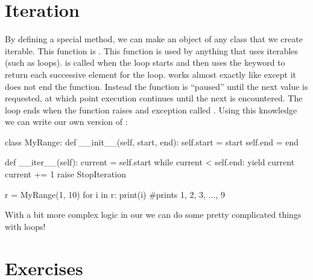 \documentclass[11pt]{cselabheader}
\begin{document}
\section{Iteration}
\label{sec:iter}
By defining a special method, we can make an object of any class that
we create iterable. This function is .
This function is used by anything that uses
iterables (such as  loops).  is called
when the loop starts and then uses the  keyword to return
each successive element for the loop.  works almost exactly
like  except it does not end the function. Instead the function
is ``paused''
until the next value is requested, at which point execution continues until the
next  is encountered. The loop ends when the function raises
and exception called .
Using this knowledge we can write our
own version of :

\begin{python3code}
class MyRange:
    def __init__(self, start, end):
        self.start = start
        self.end = end

    def __iter__(self):
        current = self.start
        while current < self.end:
            yield current
            current += 1
        raise StopIteration

r = MyRange(1, 10)
for i in r:
    print(i) #prints 1, 2, 3, ..., 9
\end{python3code}

With a bit more complex logic in our  we can do some
pretty complicated things with  loops!

\clearpage
\section{Exercises}
\label{sec:ex}
\end{document}
